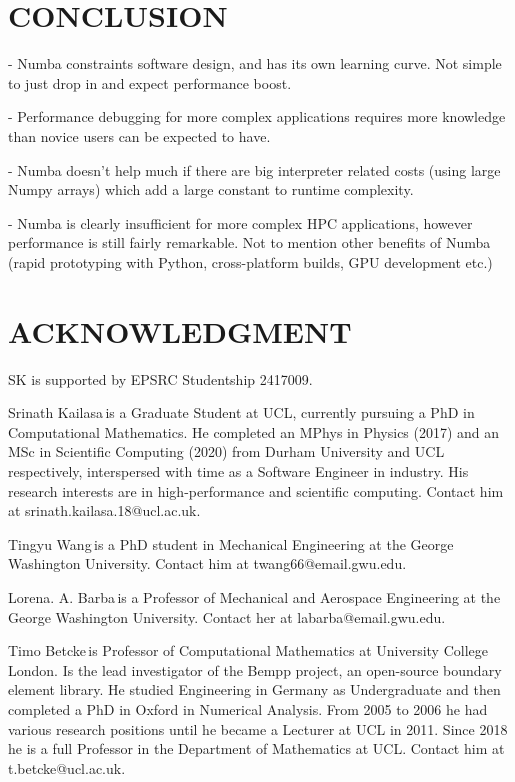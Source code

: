 \documentclass{IEEEcsmag}
\begin{document}
\section{CONCLUSION}

- Numba constraints software design, and has its own learning curve. Not simple to just drop in and expect performance boost.

- Performance debugging for more complex applications requires more knowledge than novice users can be expected to have.

- Numba doesn't help much if there are big interpreter related costs (using large Numpy arrays) which add a large constant to runtime complexity.

- Numba is clearly insufficient for more complex HPC applications, however performance is still fairly remarkable. Not to mention other benefits of Numba (rapid prototyping with Python, cross-platform builds, GPU development etc.)


\section{ACKNOWLEDGMENT}

SK is supported by EPSRC Studentship 2417009.





\begin{IEEEbiography}{Srinath Kailasa}{\,}is a Graduate Student at UCL, currently pursuing a PhD in Computational Mathematics. He completed an MPhys in Physics (2017) and an MSc in Scientific Computing (2020) from Durham University and UCL respectively, interspersed with time as a Software Engineer in industry. His research interests are in high-performance and scientific computing. Contact him at srinath.kailasa.18@ucl.ac.uk.
\end{IEEEbiography}

\begin{IEEEbiography}{Tingyu Wang}{\,}is a PhD student in Mechanical Engineering at the George Washington University. Contact him at twang66@email.gwu.edu.
\end{IEEEbiography}

\begin{IEEEbiography}{Lorena. A. Barba}{\,}is a Professor of Mechanical and Aerospace Engineering at the George Washington University.  Contact her at labarba@email.gwu.edu.
\end{IEEEbiography}

\begin{IEEEbiography}{Timo Betcke}{\,}is Professor of Computational Mathematics at University College London. Is the lead investigator of the Bempp project, an open-source boundary element library. He studied Engineering in Germany as Undergraduate and then completed a PhD in Oxford in Numerical Analysis. From 2005 to 2006 he had various research positions until he became a Lecturer at UCL in 2011. Since 2018 he is a full Professor in the Department of Mathematics at UCL. Contact him at t.betcke@ucl.ac.uk.
\end{IEEEbiography}
\end{document}
